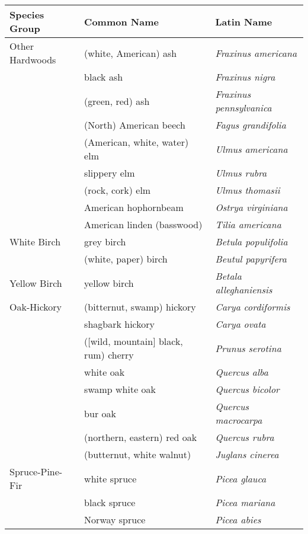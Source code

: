 \documentclass{article}
\begin{document}
\thispagestyle{empty}
\begin{table}
\centering
{\small
\begin{tabular}{lll}
\toprule
Species Group & Common Name & Latin Name \\
\midrule
Other Hardwoods        &     (white, American) ash &   \emph{Fraxinus americana} \\
       &     black ash &   \emph{Fraxinus nigra} \\
       &     (green, red) ash &   \emph{Fraxinus pennsylvanica} \\
       &     (North) American beech &   \emph{Fagus grandifolia} \\
       &     (American, white, water) elm &   \emph{Ulmus americana} \\
       &     slippery elm &   \emph{Ulmus rubra} \\
       &     (rock, cork) elm &   \emph{Ulmus thomasii} \\
       &     American hophornbeam &   \emph{Ostrya virginiana} \\
       &     American linden (basswood) &   \emph{Tilia americana} \\
White Birch        &     grey birch &   \emph{Betula populifolia} \\
        &     (white, paper) birch &   \emph{Beutul papyrifera} \\
Yellow Birch        &     yellow birch &   \emph{Betala alleghaniensis} \\
Oak-Hickory &     (bitternut, swamp) hickory &   \emph{Carya cordiformis} \\
&     shagbark hickory &   \emph{Carya ovata} \\
&     ([wild, mountain] black, rum) cherry &   \emph{Prunus serotina} \\
&     white oak &   \emph{Quercus alba} \\
&     swamp white oak &   \emph{Quercus bicolor} \\
&     bur oak &   \emph{Quercus macrocarpa} \\
&     (northern, eastern) red oak &   \emph{Quercus rubra} \\
&     (butternut, white walnut) &   \emph{Juglans cinerea} \\
Spruce-Pine-Fir       &    white spruce &   \emph{Picea glauca} \\
      &    black spruce &   \emph{Picea mariana} \\
      &    Norway spruce &   \emph{Picea abies} \\

\end{tabular}}
\end{table}
\end{document}
